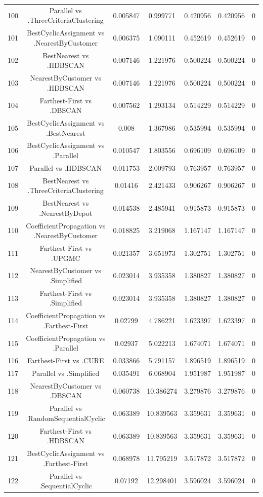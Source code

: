 \documentclass[a4paper,10pt]{article}
\begin{document}
\begin{landscape}
\begin{table}[!htp]
\begin{tabular}{ccccccc}
100&Parallel vs .ThreeCriteriaClustering&0.005847&0.999771&0.420956&0.420956&0\\
101&BestCyclicAssignment vs .NearestByCustomer&0.006375&1.090111&0.452619&0.452619&0\\
102&BestNearest vs .HDBSCAN&0.007146&1.221976&0.500224&0.500224&0\\
103&NearestByCustomer vs .HDBSCAN&0.007146&1.221976&0.500224&0.500224&0\\
104&Farthest-First vs .DBSCAN&0.007562&1.293134&0.514229&0.514229&0\\
105&BestCyclicAssignment vs .BestNearest&0.008&1.367986&0.535994&0.535994&0\\
106&BestCyclicAssignment vs .Parallel&0.010547&1.803556&0.696109&0.696109&0\\
107&Parallel vs .HDBSCAN&0.011753&2.009793&0.763957&0.763957&0\\
108&BestNearest vs .ThreeCriteriaClustering&0.01416&2.421433&0.906267&0.906267&0\\
109&BestNearest vs .NearestByDepot&0.014538&2.485941&0.915873&0.915873&0\\
110&CoefficientPropagation vs .NearestByCustomer&0.018825&3.219068&1.167147&1.167147&0\\
111&Farthest-First vs .UPGMC&0.021357&3.651973&1.302751&1.302751&0\\
112&NearestByCustomer vs .Simplified&0.023014&3.935358&1.380827&1.380827&0\\
113&Farthest-First vs .Simplified&0.023014&3.935358&1.380827&1.380827&0\\
114&CoefficientPropagation vs .Farthest-First&0.02799&4.786221&1.623397&1.623397&0\\
115&CoefficientPropagation vs .Parallel&0.02937&5.022213&1.674071&1.674071&0\\
116&Farthest-First vs .CURE&0.033866&5.791157&1.896519&1.896519&0\\
117&Parallel vs .Simplified&0.035491&6.068904&1.951987&1.951987&0\\
118&NearestByCustomer vs .DBSCAN&0.060738&10.386274&3.279876&3.279876&0\\
119&Parallel vs .RandomSequentialCyclic&0.063389&10.839563&3.359631&3.359631&0\\
120&Farthest-First vs .HDBSCAN&0.063389&10.839563&3.359631&3.359631&0\\
121&BestCyclicAssignment vs .Farthest-First&0.068978&11.795219&3.517872&3.517872&0\\
122&Parallel vs .SequentialCyclic&0.07192&12.298401&3.596024&3.596024&0\\

\end{tabular}
\end{table}
\end{landscape}
\end{document}
